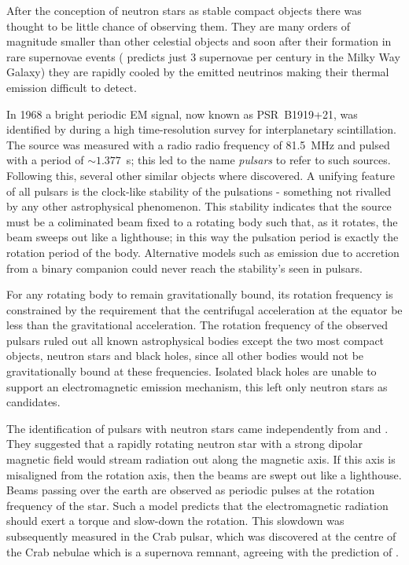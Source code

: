 After the conception of neutron stars as stable compact objects there was
thought to be little chance of observing them. They are many orders of
magnitude smaller than other celestial objects and soon after their formation
in rare supernovae events (\citet{van1991} predicts just 3 supernovae per
century in the Milky Way Galaxy)
they are rapidly cooled by the emitted neutrinos
making their thermal emission difficult to detect.

In 1968 a bright periodic EM signal, now known as PSR~B1919+21, was identified
by \citet{Hewish1968} during a high time-resolution survey for interplanetary
scintillation. The source was measured with a radio radio frequency of 81.5~MHz
and pulsed with a period of $\sim 1.377$~s; this led to the name \emph{pulsars}
to refer to such sources.  Following this, several other similar objects where
discovered. A unifying feature of all pulsars is the clock-like stability of
the pulsations - something not rivalled by any other astrophysical phenomenon.
This stability indicates that the source must be a coliminated beam fixed to a
rotating body such that, as it rotates, the beam sweeps out like a lighthouse;
in this way the pulsation period is exactly the rotation period of the body.
Alternative models such as emission due to accretion from a binary companion
could never reach the stability's seen in pulsars.

For any rotating body to remain gravitationally bound, its rotation frequency is
constrained by the requirement that the centrifugal acceleration at the equator
be less than the gravitational acceleration. The rotation frequency of the observed
pulsars ruled out all known astrophysical bodies except the two most compact
objects, neutron stars and black holes, since all other bodies would not be
gravitationally bound at these frequencies. Isolated black holes are unable to
support an electromagnetic emission mechanism, this left only neutron stars
as candidates.

The identification of pulsars with neutron stars came independently from
\citet{Pacini1967} and \citet{Gold1968}. They suggested that a rapidly rotating
neutron star with a strong dipolar magnetic field would stream radiation out
along the magnetic axis. If this axis is misaligned from the rotation axis,
then the beams are swept out like a lighthouse. Beams passing over the earth
are observed as periodic pulses at the rotation frequency of the star.  Such a
model predicts that the electromagnetic radiation should exert a torque and
slow-down the rotation.  This slowdown was subsequently measured in the Crab
pulsar, which was discovered at the centre of the Crab nebulae which is a
supernova remnant, agreeing with the prediction of \citet{Baade1934}.

